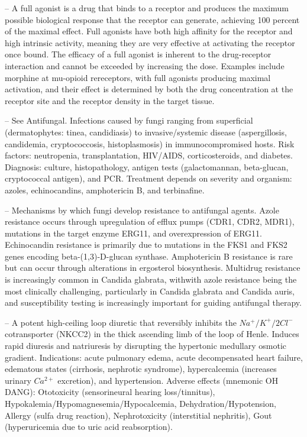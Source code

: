 -- A full agonist is a drug that binds to a receptor and produces the maximum possible biological response that the receptor can generate, achieving 100 percent of the maximal effect. Full agonists have both high affinity for the receptor and high intrinsic activity, meaning they are very effective at activating the receptor once bound. The efficacy of a full agonist is inherent to the drug-receptor interaction and cannot be exceeded by increasing the dose. Examples include morphine at mu-opioid rereceptors, with full agonists producing maximal activation, and their effect is determined by both the drug concentration at the receptor site and the receptor density in the target tissue.

-- See Antifungal. Infections caused by fungi ranging from superficial (dermatophytes: tinea, candidiasis) to invasive/systemic disease (aspergillosis, candidemia, cryptococcosis, histoplasmosis) in immunocompromised hosts. Risk factors: neutropenia, transplantation, HIV/AIDS, corticosteroids, and diabetes. Diagnosis: culture, histopathology, antigen tests (galactomannan, beta-glucan, cryptococcal antigen), and PCR. Treatment depends on severity and organism: azoles, echinocandins, amphotericin B, and terbinafine.

-- Mechanisms by which fungi develop resistance to antifungal agents. Azole resistance occurs through upregulation of efflux pumps (CDR1, CDR2, MDR1), mutations in the target enzyme ERG11, and overexpression of ERG11. Echinocandin resistance is primarily due to mutations in the FKS1 and FKS2 genes encoding beta-(1,3)-D-glucan synthase. Amphotericin B resistance is rare but can occur through alterations in ergosterol biosynthesis. Multidrug resistance is increasingly common in Candida glabrata, withwith azole resistance being the most clinically challenging, particularly in Candida glabrata and Candida auris, and susceptibility testing is increasingly important for guiding antifungal therapy.

-- A potent high-ceiling loop diuretic that reversibly inhibits the $Na^+/K^+/2Cl^-$ cotransporter (NKCC2) in the thick ascending limb of the loop of Henle. Induces rapid diuresis and natriuresis by disrupting the hypertonic medullary osmotic gradient. Indications: acute pulmonary edema, acute decompensated heart failure, edematous states (cirrhosis, nephrotic syndrome), hypercalcemia (increases urinary $Ca^{2+}$ excretion), and hypertension. Adverse effects (mnemonic OH DANG): Ototoxicity (sensorineural hearing loss/tinnitus), Hypokalemia/Hypomagnesemia/Hypocalcemia, Dehydration/Hypotension, Allergy (sulfa drug reaction), Nephrotoxicity (interstitial nephritis), Gout (hyperuricemia due to uric acid reabsorption).

